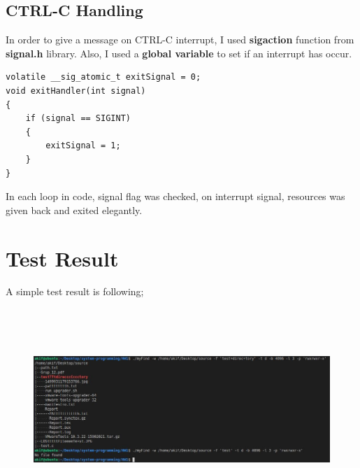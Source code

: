 \documentclass{article}
\begin{document}
\subsection{CTRL-C Handling}
In order to give a message on CTRL-C interrupt, I used \textbf{sigaction} function from \textbf{signal.h} library.
Also, I used a \textbf{global variable} to set if an interrupt has occur.
\begin{lstlisting}[style=CStyle]
volatile __sig_atomic_t exitSignal = 0;
void exitHandler(int signal)
{
    if (signal == SIGINT)
    {
        exitSignal = 1;
    }
}
\end{lstlisting}
In each loop in code, signal flag was checked, on interrupt signal, resources was given back and exited elegantly.
\section{Test Result}
A simple test result is following;
\begin{figure}[H]
    \centering
	\includegraphics[width=7in, height=3in]{result.JPG}
	\caption[Optional caption]{}
	\label{}
\end{figure}                              
\end{document}
